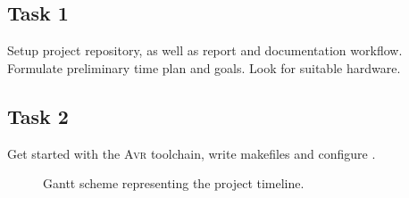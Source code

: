 \documentclass[10pt]{article}
\newcommand{\AVR}{\textsc{Avr}\xspace}
\begin{document}
\subsection*{Task 1}%
\label{sub:task_1}
Setup project repository, as well as report and documentation workflow. Formulate preliminary time plan and goals. Look for suitable hardware.
\subsection*{Task 2}%
\label{sub:task_2}
Get started with the \AVR toolchain, write makefiles and configure .


\begin{figure}[ht]
  \centering
  
  \caption{Gantt scheme representing the project timeline.}
  \label{fig:}
\end{figure}
\end{document}
